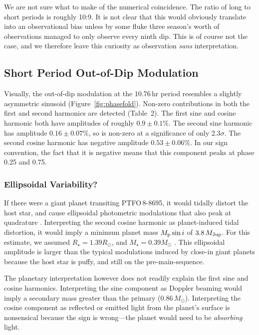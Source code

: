 \documentclass[12pt,twocolumn,tighten]{aastex62}
\newcommand{\ptfo}{PTFO$\,$8-8695}
\begin{document}
We are not sure what to make of the numerical coincidence.  The ratio
of long to short periods is roughly 10:9.  It is not clear that this
would obviously translate into an observational bias unless by some
fluke three season's worth of observations managed to only observe
every ninth dip.  This is of course not the case, and we therefore
leave this curiosity as observation {\it sans} interpretation.


\subsection{Short Period Out-of-Dip Modulation}

Visually, the out-of-dip modulation at the 10.76$\,$hr period
resembles a slightly asymmetric sinusoid (Figure~\ref{fig:phasefold}).
Non-zero contributions in both the first and second harmonics are
detected (Table~2).  The first sine and cosine harmonic both have
amplitudes of roughly $0.9\pm0.1\%$.  The second sine harmonic has
amplitude $0.16 \pm 0.07\%$, so is non-zero at a significance of only
2.3$\sigma$.  The second cosine harmonic has negative amplitude $0.53
\pm 0.06\%$.  In our sign convention, the fact that it is negative
means that this component peaks at phase 0.25 and 0.75.

\subsubsection{Ellipsoidal Variability?}
If there were a giant planet transiting \ptfo, it would tidally
distort the host star, and cause ellipsoidal photometric modulations
that also peak at quadrature \citep[see][]{shporer_astrophysics_2017}.
Interpreting the second cosine harmonic as planet-induced tidal
distortion, it would imply a minimum planet mass $M_{\rm p} \sin i$ of
$3.8\,M_{\rm Jup}$.  For this estimate, we assumed $R_\star = 1.39
R_\odot$, and $M_\star = 0.39 M_\odot$ \citep{van_eyken_ptf_2012}.
This ellipsoidal amplitude is larger than the typical modulations
induced by close-in giant planets because the host star is puffy, and
still on the pre-main-sequence.

The planetary interpretation however does not readily explain the
first sine and cosine harmonics.  Interpreting the sine component as
Doppler beaming would imply a secondary mass greater than the primary
($0.86\,M_\odot$).  Interpreting the cosine component as reflected or
emitted light from the planet's surface is nonsensical because the
sign is wrong---the planet would need to be {\it absorbing} light.
\end{document}
